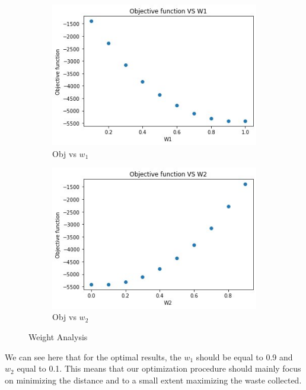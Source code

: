 \documentclass[12pt]{article}
\begin{document}
\begin{figure}[h]
    \centering
    \begin{subfigure}{0.5\textwidth}
        \centering
        \includegraphics[width=\linewidth]{weight_analysis_w1.jpg}
        \caption{Obj vs $w_1$}\label{figw1}
    \end{subfigure}%
    \begin{subfigure}{0.5\textwidth}
        \centering
        \includegraphics[width=\linewidth]{weight_analysis_w2.jpg}
        \caption{Obj vs $w_2$}\label{figw2}
    \end{subfigure}
    \caption{Weight Analysis}
    \label{fig1}
\end{figure}

We can see here that for the optimal results, the $w_1$ should be equal to 0.9 and $w_2$ equal to 0.1. This means that our optimization procedure should mainly focus on minimizing the distance and to a small extent maximizing the waste collected.
\end{document}

